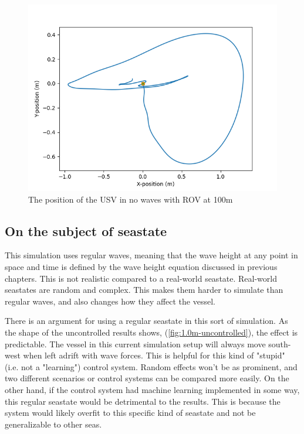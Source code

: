 \documentclass[class=article, crop=false]{standalone}
\begin{document}
\begin{figure}
    \centering
    \includegraphics{scenario1/rov-100m/0.0m/usv_position_controlled}
    \caption{The position of the USV in no waves with ROV at 100m}
    \label{fig:nowaves}
\end{figure}

\subsection{On the subject of seastate}
\label{sec:sea_discussion}
This simulation uses regular waves, meaning that the wave height at any point in space and time is defined by the wave height equation discussed in previous chapters. This is not realistic compared to a real-world seastate. Real-world seastates are random and complex. This makes them harder to simulate than regular waves, and also changes how they affect the vessel.

There is an argument for using a regular seastate in this sort of simulation. As the shape of the uncontrolled results shows, (\cref{fig:1.0m-uncontrolled}), the effect is predictable. The vessel in this current simulation setup will always move south-west when left adrift with wave forces. This is helpful for this kind of "stupid" (i.e. not a "learning") control system. Random effects won't be as prominent, and two different scenarios or control systems can be compared more easily. On the other hand, if the control system had machine learning implemented in some way, this regular seastate would be detrimental to the results. This is because the system would likely overfit to this specific kind of seastate and not be generalizable to other seas.
\end{document}

